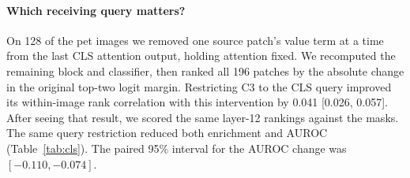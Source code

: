 \paragraph{Which receiving query matters?} On 128 of the pet images we removed one source patch's value term at a time from the last CLS attention output, holding attention fixed. We recomputed the remaining block and classifier, then ranked all 196 patches by the absolute change in the original top-two logit margin. Restricting C3 to the CLS query improved its within-image rank correlation with this intervention by 0.041 [0.026, 0.057]. After seeing that result, we scored the same layer-12 rankings against the masks. The same query restriction reduced both enrichment and AUROC (Table~\ref{tab:cls}). The paired 95\% interval for the AUROC change was $[-0.110,-0.074]$.

\begin{center}\begin{minipage}{\linewidth}
\label{tab:cls}\centering\small
\end{minipage}\end{center}
